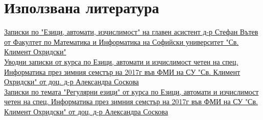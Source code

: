 \documentclass[12pt]{article}
\begin{document}
\section*{Използвана литература}

\href{https://learn.fmi.uni-sofia.bg/pluginfile.php/148269/mod_resource/content/1/eai-stefan-2017-10-03.pdf}{Записки по "Езици, автомати, изчислимост" на главен асистент д-р Стефан Вътев от Факултет по Математика и Информатика на Софийски университет "Св. Климент Охридски"} \\

\href{https://learn.fmi.uni-sofia.bg/pluginfile.php/151077/mod_resource/content/1/intro2017_2018inf1.pdf}{Уводни записки от курса по Езици, автомати и изчислимост четен на спец. Информатика през зимния семстър на 2017г във ФМИ на СУ "Св. Климент Охридски" от доц. д-р Александра Соскова} \\

\href{https://learn.fmi.uni-sofia.bg/pluginfile.php/148277/mod_resource/content/1/1automata.pdf}{Записки по темата "Регулярни езици" от курса по Езици, автомати и изчислимост четен на спец. Информатика през зимния семстър на 2017г във ФМИ на СУ "Св. Климент Охридски" от доц. д-р Александра Соскова}
\end{document}
